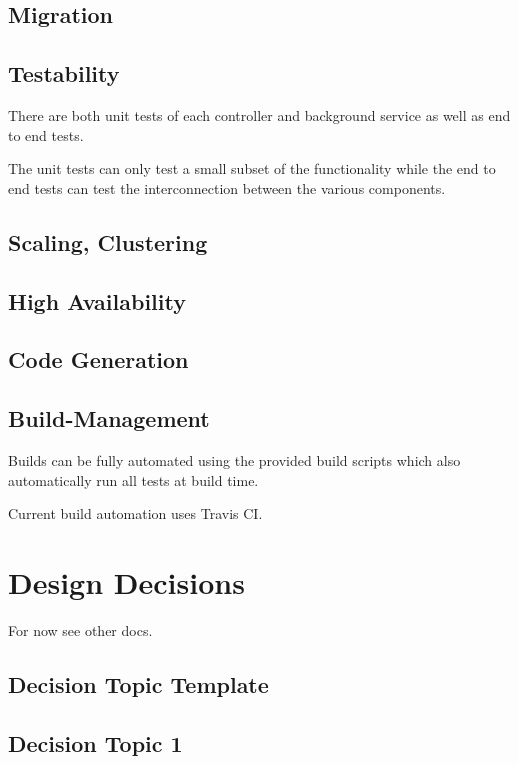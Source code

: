 \documentclass[]{article}
\begin{document}
\subsection{Migration}

\subsection{Testability}

There are both unit tests of each controller and background service as well as end to end tests. 

The unit tests can only test a small subset of the functionality while the end to end tests can test the interconnection between the various components.

\subsection{Scaling, Clustering}

\subsection{High Availability}

\subsection{Code Generation}

\subsection{Build-Management}

Builds can be fully automated using the provided build scripts which also automatically run all tests at build time. 

Current build automation uses Travis CI.

\section{Design Decisions}

For now see other docs.

\subsection{Decision Topic Template}

\subsection{Decision Topic 1}
\end{document}
